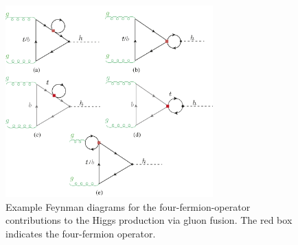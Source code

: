 	\begin{figure}[h!]
		\begin{center}
			\includegraphics[width=8cm]{fig/ggF-4F_NLO.pdf}
			\caption{Example Feynman diagrams for the four-fermion-operator contributions to the Higgs production via gluon fusion. The red box indicates the four-fermion operator.\label{fig:ggh} }
		\end{center}
		\vspace{-1.5 cm}
	\end{figure}
